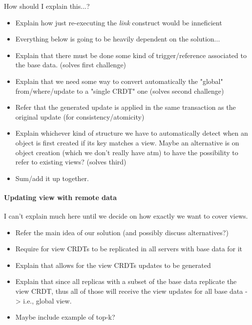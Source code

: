 \documentclass{vldb}
\newcommand{\grumbler}[2]{{\color{red}{\bf #1:} #2}}
\newcommand{\andre}[1]{\grumbler{andre}{#1}}
\begin{document}
\andre{How should I explain this...?}

\begin{itemize}
	\item Explain how just re-executing the \emph{link} construct would be inneficient
	\item Everything below is going to be heavily dependent on the solution... 
	\item Explain that there must be done some kind of trigger/reference associated to the base data. (solves first challenge)
	\item Explain that we need some way to convert automatically the "global" from/where/update to a "single CRDT" one (solves second challenge)
	\item Refer that the generated update is applied in the same transaction as the original update (for consistency/atomicity)
	\item Explain whichever kind of structure we have to automatically detect when an object is first created if its key matches a view. Maybe an alternative is on object creation (which we don't really have atm) to have the possibility to refer to existing views? (solves third)
	\item Sum/add it up together.
\end{itemize}

\paragraph{Updating view with remote data}

\andre{I can't explain much here until we decide on how exactly we want to cover views.}

\begin{itemize}
	\item Refer the main idea of our solution (and possibly discuss alternatives?)
	\item Require for view CRDTs to be replicated in all servers with base data for it
	\item Explain that allows for the view CRDTs updates to be generated
	\item Explain that since all replicas with a subset of the base data replicate the view CRDT, thus all of those will receive the view updates for all base data -> i.e., global view.
	\item Maybe include example of top-k?
\end{itemize}
\end{document}
